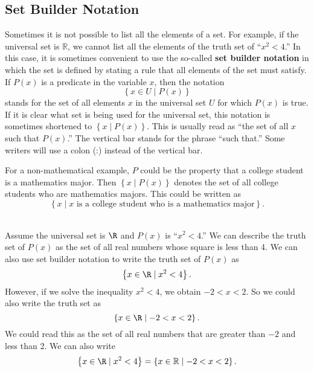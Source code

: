 \subsection*{Set Builder Notation} \label{sym:setbuilder}
Sometimes it is not possible to list all the elements of a set.  For example, if the universal set is  $\mathbb{R}$, we cannot list all the elements of the truth set of  ``$x^2  < 4$.''  In this case, it is sometimes convenient to use the so-called \textbf{set builder notation}
%
 in which the set is defined by stating a rule that all elements of the set must satisfy.  If  
$P(x)$ is a predicate in the variable  $x$, then the notation
\[
\left\{ x \in U \mid P(x) \right\}
\]
\label{sym:setbuilder}%
stands for the set of all elements  $x$  in the universal set  $U$  for which  $P(x)$ is true.  If it is clear what set is being used for the universal set, this notation is sometimes shortened to $\left\{ x \mid {P(x)} \right\}$.  This is usually read as ``the set of all $x$  such that  
$P(x)$.''  The vertical bar stands for the phrase ``such that.''  Some writers will use a colon (:)  instead of the vertical bar.

For a non-mathematical example,  $P$  could be the property that a college student is a mathematics major.  Then  $\left\{ x \mid {P(x)} \right\}$ denotes the set of all college students who are mathematics majors.  This could be written as
\[
\left\{ x \mid  x\text{ is a  college student who is a mathematics major} \right\}.
\]
%


\begin{example} \hfill \\
Assume the universal set is  $\R$ and $P( x )$ is ``$x^2  < 4$.''  We can describe the truth set of $P(x)$ as the set of all real numbers whose square is less than 4.  We can also use set builder notation to write the truth set of $P( x )$ as
\[
\left\{ {x \in \R} \mid  x^2  < 4  \right\}.
\]
However, if we solve the inequality  $x^2  < 4$, we obtain  $ - 2 < x < 2$.  So we could also write the truth set as
\[
\left\{ {x \in \R} \mid - 2 < x < 2 \right\}.
\]
We could read this as the set of all real numbers that are greater than $-2$ and less than 2.  We can also write
\[
\left\{ {x \in \R} \mid x^2  < 4 \right\} = \left\{ {x \in \mathbb{R}} \mid - 2 < x < 2 \right\}.
\]
\end{example}
\hbreak

